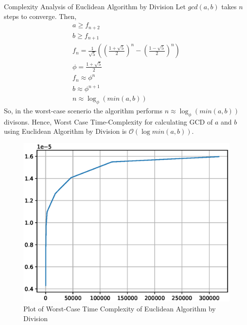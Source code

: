 \documentclass[8pt]{beamer}
\begin{document}
\begin{frame}[allowframebreaks]{Complexity Analysis of Euclidean Algorithm by Division}
Let $gcd(a,b)$ takes $n$ steps to converge. Then,
\begin{align}
a \geq f_{n+2}\\
b \geq f_{n+1}\\
f_{n}=\frac{1}{\sqrt{5}}\left(\left(\frac{1+\sqrt{5}}{2}\right)^{n}-\left(\frac{1-\sqrt{5}}{2}\right)^{n}\right)\\
\phi = \frac{1+\sqrt{5}}{2}\\
f_{n} \approx \phi^{n}\\
b \approx \phi^{n+1}\\
n \approx \log_{\phi}{\left(min(a,b)\right)}
\end{align}
So, in the worst-case scenerio the algorithm performs $n \approx \log_{\phi}{\left(min(a,b)\right)} $ divisons. Hence, Worst Case Time-Complexity for calculating GCD of $a$ and  $b$ using Euclidean Algorithm by Division is $\mathcal{O}(\log min(a,b))$.\\

\framebreak

\begin{figure}[!ht]
	\centering
	\includegraphics[width=\columnwidth]{figs/Euclid_Division.eps}
	\caption{Plot of Worst-Case Time Complexity of Euclidean Algorithm by Division}
	\label{fig:1}
\end{figure}

\end{frame}
\end{document}
